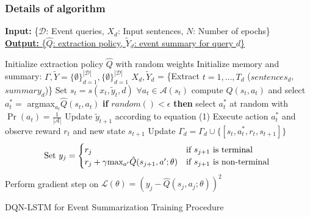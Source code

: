 \documentclass[]{beamer}
\begin{document}
\begin{frame}
			\frametitle{Details of algorithm}
\begin{algorithm}[H]
  \tiny
        \textbf{Input:} { \rm  \{$\mathcal{D}$: Event queries, $X_d$: Input sentences, $N$: Number of epochs\} } \\
        \underline{\textbf{Output:} \rm \{$\hat{Q}$: extraction policy, $\tilde{Y}_d$: event summary for query $d$\} }
\begin{algorithmic}[1]
    \STATE \rm Initialize extraction policy $\hat{Q}$ with random weights
    \STATE \rm Initialize memory and summary: $\Gamma, \tilde{Y} =  \{\emptyset \}^{\mathcal{|D|}}_{d=1},  \{\emptyset \}^{\mathcal{|D|}}_{d=1} $
            \STATE $X_{d}, \tilde{Y}_{d}$ = \{Extract $t=1,...,T_d$ ($sentences_d$, $summary_d$)\}
                \STATE Set $s_t = s(x_t, \tilde{y}_t, d)$
                \STATE $ \forall a_t \in \mathcal{A}(s_t)$ \textrm{compute} $\hat{Q}(s_t, a_t)$ and select $a^{*}_t =$ argmax$_{a_{t}}\hat{Q}(s_t, a_t)$
                \STATE  \textbf{if} $random() < \epsilon$ \textbf{then} select $a^{*}_t $ at random with $\Pr(a_t) =\frac{1}{| \mathcal{A} |} $
                \STATE Update $\tilde{y}_{t+1}$ according to equation (1)
                \STATE Execute action $a^{*}_t$ and observe reward $r_t$ and new state $s_{t+1}$
                \STATE Update $\Gamma_d = \Gamma_d \cup \{ [s_t, a^{*}_t, r_t, s_{t+1}]\}$
            \ENDFOR
        \ENDFOR
                \STATE \[\textrm{Set } y_j =
                        \begin{cases}
                            r_j                                             & \text{if $s_{j+1}$ is terminal } \\
                                r_j + \gamma $max$_{a'}\hat{Q}(s_{j+1}, a'; \theta)     & \text{if $s_{j+1}$ is non-terminal } 
                        \end{cases} 
                        \]
                        \STATE Perform gradient step on $\mathcal{L}(\theta) = (y_j - \hat{Q}(s_j, a_j; \theta))^2$
            \ENDFOR
    \ENDFOR
\end{algorithmic}
\caption*{ DQN-LSTM for Event Summarization Training Procedure}
\label{alg:seq}
\end{algorithm}
\end{frame}
\end{document}
